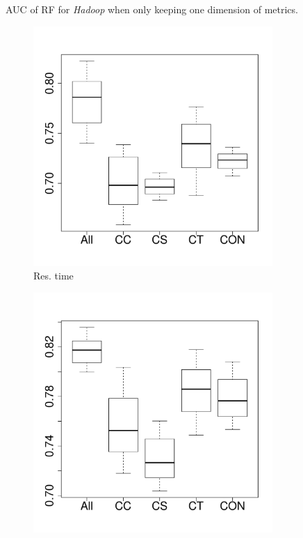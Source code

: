 \begin{figure}[t]
	\caption{AUC of RF for \emph{Hadoop} when only keeping one dimension of metrics.}
	\label{fig:importance-dimenssion-keep-hadoop}
\end{figure}

\begin{figure}[t]
	\centering
        \begin{subfigure}{0.19\textwidth}
                \includegraphics[width=\linewidth]{Figures/runtime-cassandrakeep-importance.pdf}
                \caption{Res. time}
        \end{subfigure}%
        \begin{subfigure}{0.19\textwidth}
                \includegraphics[width=\linewidth]{Figures/cpu-cassandrakeep-importance.pdf}

\end{subfigure}
\end{figure}
